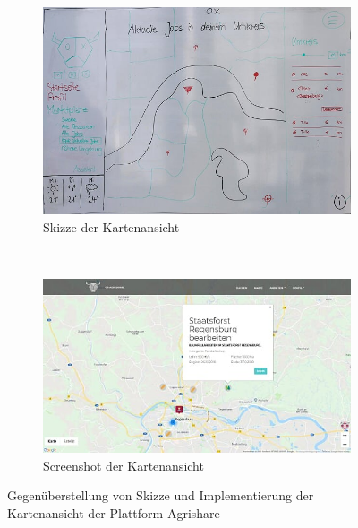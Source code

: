 \begin{figure}
    \centering
    \begin{subfigure}[b]{0.45\textwidth}
        \includegraphics[width=\textwidth]{99_IMG/03_Umsetzung/mapWireframe_3.jpg}
        \caption{Skizze der Kartenansicht}
        \label{fig:mapWireframe}
    \end{subfigure}
    ~ %
    \begin{subfigure}[b]{0.45\textwidth}
        \includegraphics[width=\textwidth]{99_IMG/03_Umsetzung/mapScreenshot.jpg}
        \caption{Screenshot der Kartenansicht}
        \label{fig:mapScreenshot}
    \end{subfigure}
    \caption{Gegenüberstellung von Skizze und Implementierung der Kartenansicht der Plattform Agrishare}\label{fig:mapView}
\end{figure}

